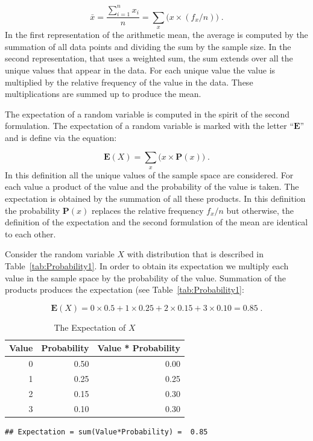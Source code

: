 \documentclass[]{krantz}
\newcommand{\Expec}{\mathbf{E}}
\newcommand{\Prob}{\mathbf{P}}
\theoremstyle{definition}
\theoremstyle{definition}
\theoremstyle{definition}
\theoremstyle{remark}
\begin{document}
\[\bar x = \frac{\sum_{i=1}^n x_i}{n} = \sum_x \big(x \times (f_x/n)\big)\;.\]
In the first representation of the arithmetic mean, the average is
computed by the summation of all data points and dividing the sum by the
sample size. In the second representation, that uses a weighted sum, the
sum extends over all the unique values that appear in the data. For each
unique value the value is multiplied by the relative frequency of the
value in the data. These multiplications are summed up to produce the
mean.

The expectation of a random variable is computed in the spirit of the
second formulation. The expectation of a random variable is marked with
the letter ``\(\Expec\)'' and is define via the equation:

\[\Expec(X) = \sum_x \big(x \times \Prob(x)\big)\;.\] In this definition
all the unique values of the sample space are considered. For each value
a product of the value and the probability of the value is taken. The
expectation is obtained by the summation of all these products. In this
definition the probability \(\Prob(x)\) replaces the relative frequency
\(f_x/n\) but otherwise, the definition of the expectation and the second
formulation of the mean are identical to each other.

Consider the random variable \(X\) with distribution that is described in
Table~\ref{tab:Probability1}. In order to obtain its expectation we
multiply each value in the sample space by the probability of the value.
Summation of the products produces the expectation (see
Table~\ref{tab:Probability1}:

\[\Expec(X) = 0 \times 0.5 + 1 \times 0.25 + 2 \times 0.15 + 3\times 0.10 = 0.85\;.\]

\begin{table}[t]

\caption{\label{tab:Probability2}The Expectation of $X$}
\centering
\begin{tabular}{rrr}
\toprule
Value & Probability & Value * Probability\\
\midrule
0 & 0.50 & 0.00\\
1 & 0.25 & 0.25\\
2 & 0.15 & 0.30\\
3 & 0.10 & 0.30\\
\bottomrule
\end{tabular}
\end{table}

\begin{verbatim}
## Expectation = sum(Value*Probability) =  0.85
\end{verbatim}
\end{document}
